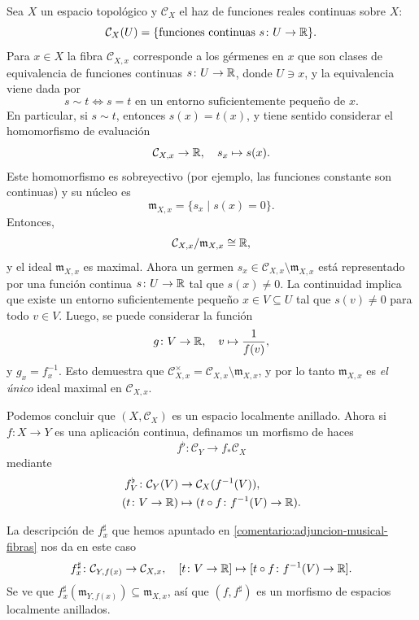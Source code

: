 \documentclass{article}
\numberwithin{equation}{section}
\theoremstyle{definition}
\begin{document}
\begin{ejemplo}
  \label{ejemplo:ELA-functiones-continuas}
  Sea $X$ un espacio topológico y $\mathcal{C}_X$ el haz de funciones reales
  continuas sobre $X$:
  $$\mathcal{C}_X (U) = \{ \text{funciones continuas }s\colon U\to \mathbb{R} \}.$$
  Para $x \in X$ la fibra $\mathcal{C}_{X,x}$ corresponde a los gérmenes en $x$
  que son clases de equivalencia de funciones continuas $s\colon U\to \mathbb{R}$,
  donde $U\ni x$, y la equivalencia viene dada por
  $$s \sim t \iff s = t \text{ en un entorno suficientemente pequeño de }x.$$
  En particular, si $s \sim t$, entonces $s (x) = t (x)$, y tiene sentido
  considerar el homomorfismo de evaluación
  $$\mathcal{C}_{X,x} \to \mathbb{R}, \quad s_x \mapsto s (x).$$
  Este homomorfismo es sobreyectivo (por ejemplo, las funciones constante son
  continuas) y su núcleo es
  $$\mathfrak{m}_{X,x} = \{ s_x \mid s (x) = 0 \}.$$
  Entonces,
  $$\mathcal{C}_{X,x}/\mathfrak{m}_{X,x} \cong \mathbb{R},$$
  y el ideal $\mathfrak{m}_{X,x}$ es maximal. Ahora un germen
  $s_x \in \mathcal{C}_{X,x}\setminus \mathfrak{m}_{X,x}$ está representado por
  una función continua $s\colon U\to \mathbb{R}$ tal que $s (x) \ne 0$. La continuidad
  implica que existe un entorno suficientemente pequeño $x \in V \subseteq U$
  tal que $s (v) \ne 0$ para todo $v \in V$. Luego, se puede considerar la
  función
  $$g\colon V\to \mathbb{R}, \quad v \mapsto \frac{1}{f(v)},$$
  y $g_x = f_x^{-1}$. Esto demuestra que
  $\mathcal{C}_{X,x}^\times = \mathcal{C}_{X,x}\setminus \mathfrak{m}_{X,x}$,
  y por lo tanto $\mathfrak{m}_{X,x}$ es \emph{el único} ideal maximal en
  $\mathcal{C}_{X,x}$.

  Podemos concluir que $(X, \mathcal{C}_X)$ es un espacio localmente
  anillado. Ahora si $f\colon X\to Y$ es una aplicación continua, definamos
  un morfismo de haces
  $$f^\flat\colon \mathcal{C}_Y \to f_* \mathcal{C}_X$$
  mediante
  \begin{align*}
    f^\flat_V\colon \mathcal{C}_Y (V) & \to \mathcal{C}_X (f^{-1} (V)),\\
    (t\colon V\to \mathbb{R}) & \mapsto (t\circ f\colon f^{-1} (V) \to \mathbb{R}).
  \end{align*}

  La descripción de $f^\sharp_x$ que hemos apuntado en
  \ref{comentario:adjuncion-musical-fibras} nos da en este caso
  \[ f^\sharp_x\colon \mathcal{C}_{Y,f(x)} \to \mathcal{C}_{X,x}, \quad
     [t\colon V\to \mathbb{R}] \mapsto [t\circ f\colon f^{-1} (V) \to \mathbb{R}]. \]
  Se ve que $f^\sharp_x (\mathfrak{m}_{Y,f(x)}) \subseteq \mathfrak{m}_{X,x}$,
  así que $(f,f^\sharp)$ es un morfismo de espacios localmente anillados.
\end{ejemplo}
\end{document}
